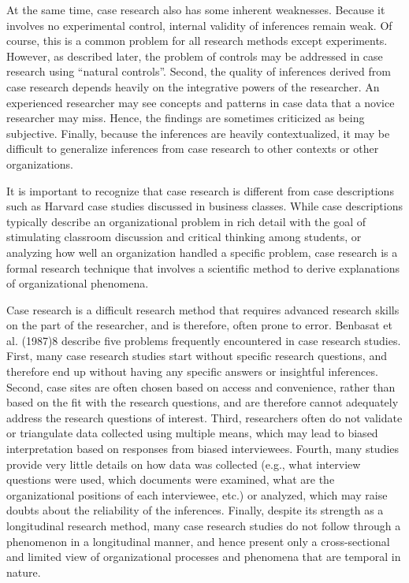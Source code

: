 At the same time, case research also has some inherent weaknesses. Because it involves no experimental control, internal validity of inferences remain weak. Of course, this is a common problem for all research methods except experiments. However, as described later, the problem of controls may be addressed in case research using “natural controls”. Second, the quality of inferences derived from case research depends heavily on the integrative powers of the researcher. An experienced researcher may see concepts and patterns in case data that a novice researcher may miss. Hence, the findings are sometimes criticized as being subjective. Finally, because the inferences are heavily contextualized, it may be difficult to generalize inferences from case research to other contexts or other organizations.

It is important to recognize that case research is different from case descriptions such as Harvard case studies discussed in business classes. While case descriptions typically describe an organizational problem in rich detail with the goal of stimulating classroom discussion and critical thinking among students, or analyzing how well an organization handled a specific problem, case research is a formal research technique that involves a scientific method to derive explanations of organizational phenomena.

Case research is a difficult research method that requires advanced research skills on the part of the researcher, and is therefore, often prone to error. Benbasat et al. (1987)8 describe five problems frequently encountered in case research studies. First, many case research studies start without specific research questions, and therefore end up without having any specific answers or insightful inferences. Second, case sites are often chosen based on access and convenience, rather than based on the fit with the research questions, and are therefore cannot adequately address the research questions of interest. Third, researchers often do not validate or triangulate data collected using multiple means, which may lead to biased interpretation based on responses from biased interviewees. Fourth, many studies provide very little details on how data was collected (e.g., what interview questions were used, which documents were examined, what are the organizational positions of each interviewee, etc.) or analyzed, which may raise doubts about the reliability of the inferences. Finally, despite its strength as a longitudinal research method, many case research studies do not follow through a phenomenon in a longitudinal manner, and hence present only a cross-sectional and limited view of organizational processes and phenomena that are temporal in nature.

